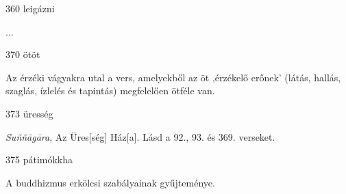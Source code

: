 
\begin{notesdescription}

\item[{360}
{leigázni}
{}] \hfill\par

...

\item[{370}
{ötöt}
{}]

Az érzéki vágyakra utal a vers, amelyekből az öt ‚érzékelő erőnek’ (látás, hallás, szaglás, ízlelés és tapintás) megfelelően ötféle van.

\item[{373}
{üresség}
{}]

\textit{Su\~n\~n\=ag\=ara}, Az Üres[ség] Ház[a]. Lásd a 92., 93. és 369. verseket.

\item[{375}
{pátimókkha}
{}]

A buddhizmus erkölcsi szabályainak gyűjteménye.

\end{notesdescription}

